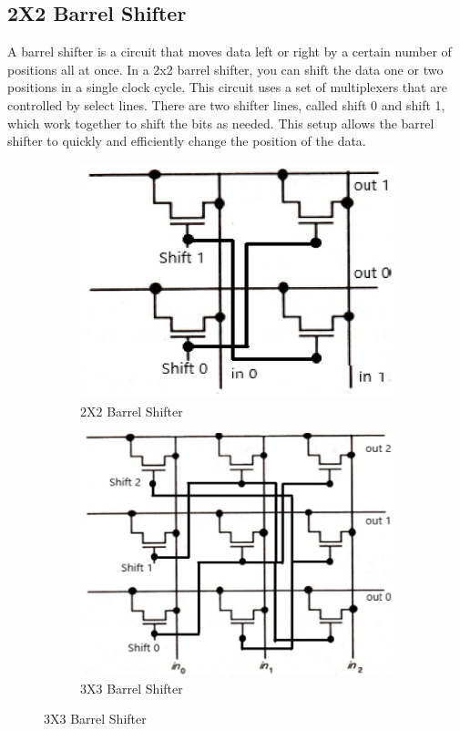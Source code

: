 \documentclass[a4paper,12pt]{article}
\begin{document}
		\subsection{2X2 Barrel Shifter}
	A barrel shifter is a circuit that moves data left or right by a certain number of positions all at once. In a 2x2 barrel shifter, you can shift the data one or two positions in a single clock cycle. This circuit uses a set of multiplexers that are controlled by select lines. There are two shifter lines, called shift 0 and shift 1, which work together to shift the bits as needed. This setup allows the barrel shifter to quickly and efficiently change the position of the data.
		\begin{figure}[H]
		\centering
		\begin{subfigure}[t]{0.49\textwidth}
			\centering
			\includegraphics[width=1\linewidth]{Images/3}
			\caption{2X2 Barrel Shifter}
		\end{subfigure}
		\hfill
		\begin{subfigure}[t]{0.48\textwidth}
			\centering
			\includegraphics[width=1\linewidth]{Images/4}
			\caption{ 3X3 Barrel Shifter}
		\end{subfigure}
	\end{figure}
\end{document}
